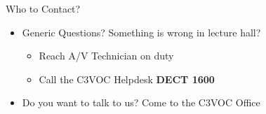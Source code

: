 
\begin{frame}{Who to Contact?}
	\begin{itemize}
		\item Generic Questions? Something is wrong in lecture hall?
		\begin{itemize}
			\item Reach A/V Technician on duty
			\item Call the C3VOC Helpdesk \textbf{DECT 1600}
		\end{itemize}
		\item Do you want to talk to us? Come to the C3VOC Office
	\end{itemize}
\end{frame}
